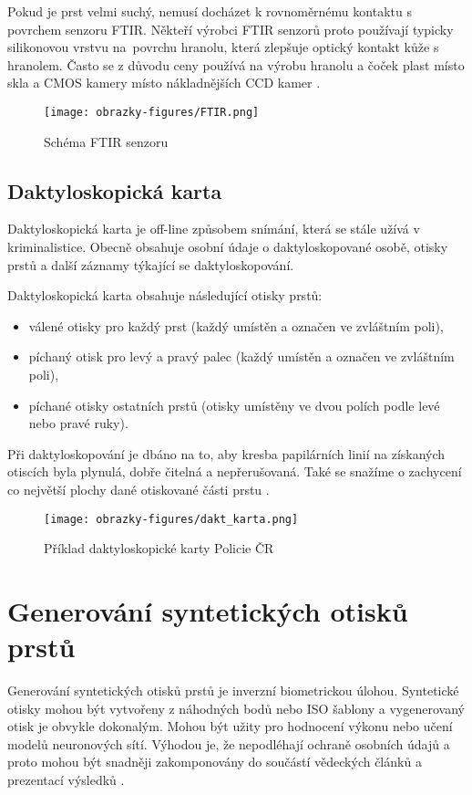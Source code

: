Pokud je prst velmi suchý, nemusí docházet k rovnoměrnému kontaktu s povrchem senzoru FTIR. Někteří výrobci FTIR senzorů proto používají typicky silikonovou vrstvu na~povrchu hranolu, která zlepšuje optický kontakt kůže s hranolem. Často se z důvodu ceny používá na výrobu hranolu a čoček plast místo skla a CMOS kamery místo nákladnějších CCD kamer \cite{Maltoni2009}.

\begin{figure}[!htbp]
    \centering
    \texttt{[image: obrazky-figures/FTIR.png]}
    \caption{Schéma FTIR senzoru \cite{Maltoni2009}}
\end{figure}
\subsection*{Daktyloskopická karta}
Daktyloskopická karta je off-line způsobem snímání, která se stále užívá v kriminalistice. Obecně obsahuje osobní údaje o daktyloskopované osobě, otisky prstů a další záznamy týkající se daktyloskopování.

Daktyloskopická karta obsahuje následující otisky prstů:
\begin{itemize}
    \item válené otisky pro každý prst (každý umístěn a označen ve zvláštním poli),
    \item píchaný otisk pro levý a pravý palec (každý umístěn a označen ve zvláštním poli),
    \item píchané otisky ostatních prstů (otisky umístěny ve dvou polích podle levé nebo pravé ruky).
\end{itemize}

Při daktyloskopování je dbáno na to, aby kresba papilárních linií na získaných otiscích byla plynulá, dobře čitelná a nepřerušovaná. Také se snažíme o zachycení co největší plochy dané otiskované části prstu \cite{BIOdaktylLecture}.

\begin{figure}[!htbp]
    \centering
    \texttt{[image: obrazky-figures/dakt\_karta.png]}
    \caption{Příklad daktyloskopické karty Policie ČR \cite{BIOdaktylLecture}}
\end{figure}

\section{Generování syntetických otisků prstů}
Generování syntetických otisků prstů je inverzní biometrickou úlohou. Syntetické otisky mohou být vytvořeny z náhodných bodů nebo ISO šablony a vygenerovaný otisk je obvykle dokonalým. Mohou být užity pro hodnocení výkonu nebo učení modelů neuronových sítí. Výhodou je, že nepodléhají ochraně osobních údajů a proto mohou být snadněji zakomponovány do součástí vědeckých článků a prezentací výsledků \cite{BIOotiskyLecture}.

